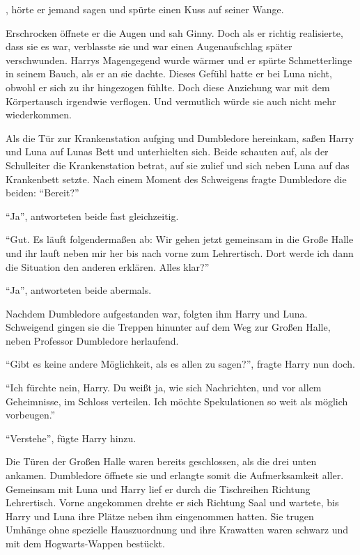 , hörte er jemand sagen und spürte einen Kuss auf seiner Wange.

Erschrocken öffnete er die Augen und sah Ginny. Doch als er richtig realisierte, dass sie es war, verblasste sie und war einen Augenaufschlag später verschwunden. Harrys Magengegend wurde wärmer und er spürte Schmetterlinge in seinem Bauch, als er an sie dachte. Dieses Gefühl hatte er bei Luna nicht, obwohl er sich zu ihr hingezogen fühlte. Doch diese Anziehung war mit dem Körpertausch irgendwie verflogen. Und vermutlich würde sie auch nicht mehr wiederkommen.

\trenn

Als die Tür zur Krankenstation aufging und Dumbledore hereinkam, saßen Harry und Luna auf Lunas Bett und unterhielten sich. Beide schauten auf, als der Schulleiter die Krankenstation betrat, auf sie zulief und sich neben Luna auf das Krankenbett setzte. Nach einem Moment des Schweigens fragte Dumbledore die beiden: \enquote{Bereit?}

\enquote{Ja}, antworteten beide fast gleichzeitig.

\enquote{Gut. Es läuft folgendermaßen ab: Wir gehen jetzt gemeinsam in die Große Halle und ihr lauft neben mir her bis nach vorne zum Lehrertisch. Dort werde ich dann die Situation den anderen erklären. Alles klar?}

\enquote{Ja}, antworteten beide abermals.

Nachdem Dumbledore aufgestanden war, folgten ihm Harry und Luna. Schweigend gingen sie die Treppen hinunter auf dem Weg zur Großen Halle, neben Professor Dumbledore herlaufend.

\enquote{Gibt es keine andere Möglichkeit, als es allen zu sagen?}, fragte Harry nun doch.

\enquote{Ich fürchte nein, Harry. Du weißt ja, wie sich Nachrichten, und vor allem Geheimnisse, im Schloss verteilen. Ich möchte Spekulationen so weit als möglich vorbeugen.}

\enquote{Verstehe}, fügte Harry hinzu.

Die Türen der Großen Halle waren bereits geschlossen, als die drei unten ankamen. Dumbledore öffnete sie und erlangte somit die Aufmerksamkeit aller. Gemeinsam mit Luna und Harry lief er durch die Tischreihen Richtung Lehrertisch. Vorne angekommen drehte er sich Richtung Saal und wartete, bis Harry und Luna ihre Plätze neben ihm eingenommen hatten. Sie trugen Umhänge ohne spezielle Hauszuordnung und ihre Krawatten waren schwarz und mit dem Hogwarts-Wappen bestückt.

